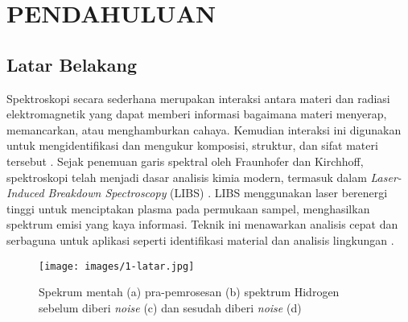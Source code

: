 \chapter{PENDAHULUAN}




\section{Latar Belakang}


\par  Spektroskopi secara sederhana merupakan  interaksi antara materi dan radiasi elektromagnetik yang dapat memberi informasi bagaimana materi menyerap, memancarkan, atau menghamburkan cahaya. Kemudian interaksi ini  digunakan untuk mengidentifikasi dan mengukur komposisi, struktur, dan sifat materi tersebut \parencite{hollas2013}.  
Sejak penemuan garis spektral oleh Fraunhofer dan Kirchhoff, spektroskopi telah menjadi dasar analisis kimia modern, termasuk dalam \textit{Laser-Induced Breakdown Spectroscopy} (LIBS) \parencite{thorne1999}. LIBS menggunakan laser berenergi tinggi untuk menciptakan plasma pada permukaan sampel, menghasilkan spektrum emisi yang kaya informasi. Teknik ini menawarkan analisis cepat dan serbaguna untuk aplikasi seperti identifikasi material dan analisis lingkungan \parencite{thorne1999}.
\begin{figure}
    \centering
    \texttt{[image: images/1-latar.jpg]}
    \caption{Spekrum mentah (a) pra-pemrosesan (b) spektrum Hidrogen sebelum diberi \textit{noise} (c) dan sesudah diberi \textit{noise} (d) \citep{gasior2023analysis}}
    \label{fig:kenapa}
\end{figure}

